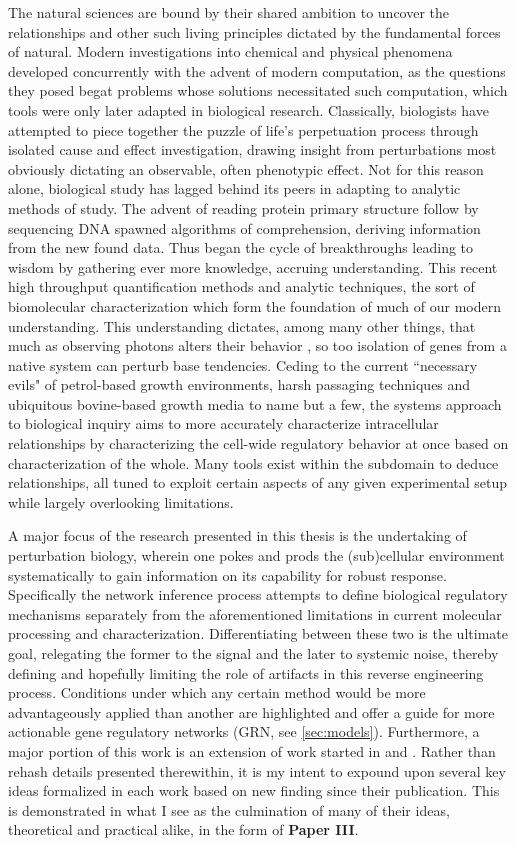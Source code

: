 The natural sciences are bound by their shared ambition to uncover the relationships and other such living principles dictated by the fundamental forces of natural. Modern investigations into chemical and physical phenomena developed concurrently with the advent of modern computation, as the questions they posed begat problems whose solutions necessitated such computation, which tools were only later adapted in biological research. Classically, biologists have attempted to piece together the puzzle of life's perpetuation process through isolated cause and effect investigation, drawing insight from perturbations most obviously dictating an observable, often phenotypic effect. Not for this reason alone, biological study has lagged behind its peers in adapting to analytic methods of study. The advent of reading protein primary structure follow by sequencing DNA spawned algorithms of comprehension, deriving information from the new found data. Thus began the cycle of breakthroughs leading to wisdom by gathering ever more knowledge, \ie accruing understanding. This recent high throughput quantification methods and analytic techniques, the sort of biomolecular characterization which form the foundation of much of our modern understanding. This understanding dictates, among many other things, that much as observing photons alters their behavior \citep{young1832bakerian}, so too isolation of genes from a native system can perturb base tendencies. Ceding to the current ``necessary evils" of petrol-based growth environments, harsh passaging techniques and ubiquitous bovine-based growth media to name but a few, the systems approach to biological inquiry aims to more accurately characterize intracellular relationships by characterizing the cell-wide regulatory behavior at once based on characterization of the whole. Many tools exist within the subdomain to deduce relationships, all tuned to exploit certain aspects of any given experimental setup while largely overlooking limitations.

A major focus of the research presented in this thesis is the undertaking of perturbation biology, wherein one pokes and prods the (sub)cellular environment systematically to gain information on its capability for robust response. Specifically the network inference process attempts to define biological regulatory mechanisms separately from the aforementioned limitations in current molecular processing and characterization. Differentiating between these two is the ultimate goal, relegating the former to the signal and the later to systemic noise, thereby defining and hopefully limiting the role of artifacts in this reverse engineering process. Conditions under which any certain method would be more advantageously applied than another are highlighted and offer a guide for more actionable gene regulatory networks (GRN, see \cref{sec:models}). Furthermore, a major portion of this work is an extension of work started in \cite{Nordling2013} and \cite{Tjarnberg2015etb}. Rather than rehash details presented therewithin, it is my intent to expound upon several key ideas formalized in each work based on new finding since their publication. This is demonstrated in what I see as the culmination of many of their ideas, theoretical and practical alike, in the form of \textbf{Paper III}.

